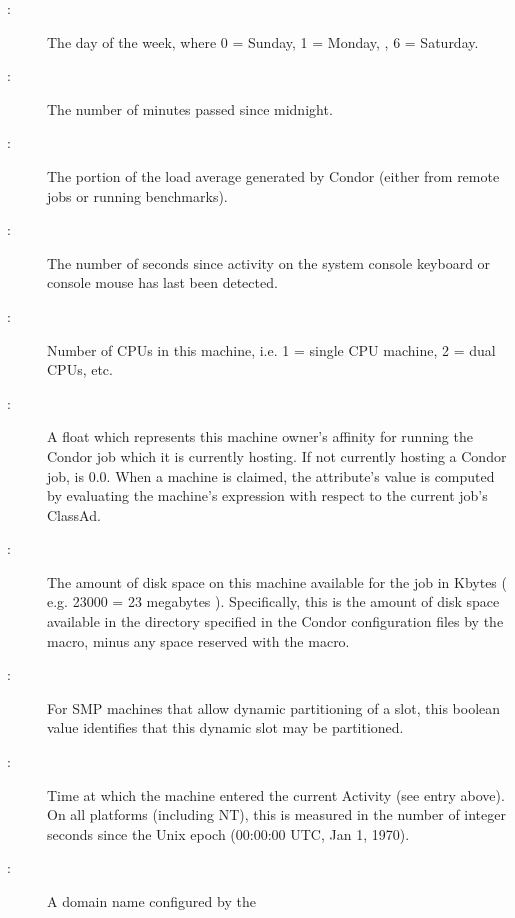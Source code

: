\begin{description}
\item[:] The day of the week, where 0 = Sunday, 1 = Monday, \Dots, 6 = Saturday. 
%
\item[:] The number of minutes passed since midnight.
%
\item[:] The portion of the load average generated by Condor (either
from remote jobs or running benchmarks).
%
\item[:] The number of seconds since activity on the system
console keyboard or console mouse has last been detected.
%
\item[:] Number of CPUs in this machine, i.e. 1 = single CPU machine, 2 = dual
CPUs, etc.
%
\item[:] A float which represents this machine
owner's affinity
for running the Condor job which it is currently hosting.  If not
currently hosting a Condor job,  is 0.0.
When a machine is claimed,
the attribute's value is computed by evaluating the machine's
 expression with respect to the current job's ClassAd.
%
\item[:] The amount of disk space on this machine available for
the job in Kbytes ( e.g. 23000 = 23 megabytes ).  Specifically, this
is the amount of disk space available in the directory specified in
the Condor configuration files by the  macro, minus any
space reserved with the  macro.
%
\label{DynamicSlot-machine-attribute} 
\item[:] For SMP machines that allow dynamic
partitioning of a slot,
this boolean value identifies that this dynamic slot may be partitioned.
%
\item[:] Time at which the machine
entered the current Activity (see  entry above).  On
all platforms (including NT), this is measured in the number of
integer seconds since the Unix epoch (00:00:00 UTC, Jan 1, 1970).
%
\item[:] A domain name configured by the

\end{description}
